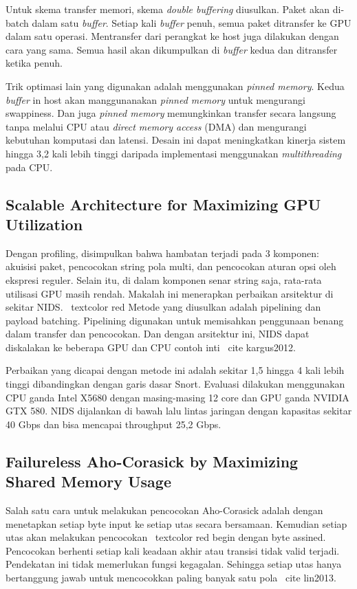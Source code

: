 \documentclass[conference]{IEEEtran}
\begin{document}
        Untuk skema transfer memori, skema \emph{double buffering} diusulkan. Paket akan di-batch dalam satu \emph{buffer}. Setiap kali \emph{buffer} penuh, semua paket ditransfer ke GPU dalam satu operasi. Mentransfer dari perangkat ke host juga dilakukan dengan cara yang sama. Semua hasil akan dikumpulkan di \emph{buffer} kedua dan ditransfer ketika penuh.
        
        Trik optimasi lain yang digunakan adalah menggunakan \emph{pinned memory}. Kedua \emph{buffer} in host akan manggunanakan \emph{pinned memory} untuk mengurangi swappiness. Dan juga \emph{pinned memory} memungkinkan transfer secara langsung tanpa melalui CPU atau \emph{direct memory access} (DMA) dan mengurangi kebutuhan komputasi dan latensi. Desain ini dapat meningkatkan kinerja sistem hingga 3,2 kali lebih tinggi daripada implementasi menggunakan \emph{multithreading} pada CPU.

    \subsection{Scalable Architecture for Maximizing GPU Utilization}

        Dengan profiling, disimpulkan bahwa hambatan terjadi pada 3 komponen: akuisisi paket, pencocokan string pola multi, dan pencocokan aturan opsi oleh ekspresi reguler. Selain itu, di dalam komponen senar string saja, rata-rata utilisasi GPU masih rendah. Makalah ini menerapkan perbaikan arsitektur di sekitar NIDS. \ textcolor {red} {Metode yang diusulkan} adalah pipelining dan payload batching. Pipelining digunakan untuk memisahkan penggunaan benang dalam transfer dan pencocokan. Dan dengan arsitektur ini, NIDS dapat diskalakan ke beberapa GPU dan CPU contoh inti \ cite {kargus2012}.
        
        Perbaikan yang dicapai dengan metode ini adalah sekitar 1,5 hingga 4 kali lebih tinggi dibandingkan dengan garis dasar Snort. Evaluasi dilakukan menggunakan CPU ganda Intel X5680 dengan masing-masing 12 core dan GPU ganda NVIDIA GTX 580. NIDS dijalankan di bawah lalu lintas jaringan dengan kapasitas sekitar 40 Gbps dan bisa mencapai throughput 25,2 Gbps.

    \subsection{Failureless Aho-Corasick by Maximizing Shared Memory Usage}

        Salah satu cara untuk melakukan pencocokan Aho-Corasick adalah dengan menetapkan setiap byte input ke setiap utas secara bersamaan. Kemudian setiap utas akan melakukan pencocokan \ textcolor {red} {begin} dengan byte assined. Pencocokan berhenti setiap kali keadaan akhir atau transisi tidak valid terjadi. Pendekatan ini tidak memerlukan fungsi kegagalan. Sehingga setiap utas hanya bertanggung jawab untuk mencocokkan paling banyak satu pola \ cite {lin2013}.
        
\end{document}
